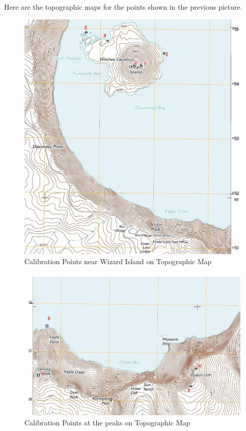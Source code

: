 \documentclass[11pt,psfig]{article}
\begin{document}
Here are the topographic maps for the points shown in the previous picture. 
\begin{figure}[H]
\centering
\includegraphics[width=\columnwidth]{sfmResults1/TopMap_withPoints_wizardIsland.png}
\caption{Calibration Points near Wizard Island on Topographic Map}
\end{figure}
\begin{figure}[H]
\centering
\includegraphics[width=\columnwidth]{sfmResults1/TopMap_withPoints_peaks.png}
\caption{Calibration Points at the peaks on Topographic Map}
\end{figure}
\end{document}
